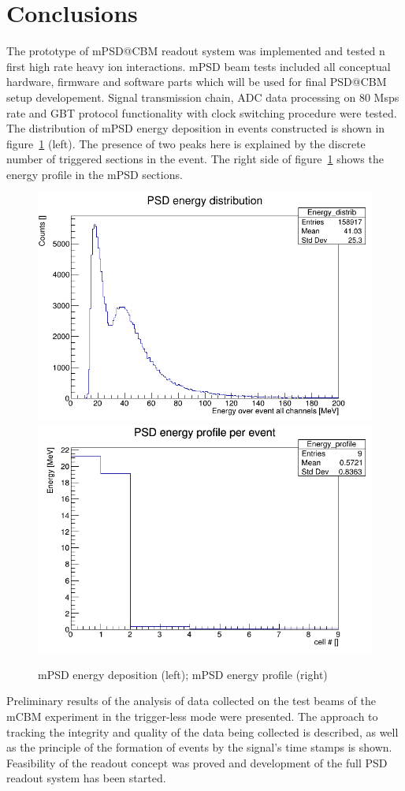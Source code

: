 \documentclass[a4paper,11pt]{article}
\begin{document}
\section{Conclusions}
The prototype of mPSD@CBM readout system was implemented and tested n first high rate heavy ion interactions. mPSD beam tests included all conceptual hardware, firmware and software parts which will be used for final PSD@CBM setup developement. Signal transmission chain, ADC data processing on 80 Msps rate and GBT protocol functionality with clock switching procedure were tested.
The distribution of mPSD energy deposition in events constructed is shown in figure~\ref{fig:7} (left). The presence of two peaks here is explained by the discrete number of triggered sections in the event. The right side of figure~\ref{fig:7} shows the energy profile in the mPSD sections.

\begin{figure}[htbp]
\centering %
\includegraphics[width=.45\textwidth]{PsdEdepInEvent_calibrd.png}
\qquad
\includegraphics[width=.45\textwidth]{PsdEprofileInEvent_calibrd.png}
\caption{\label{fig:7} mPSD energy deposition (left); mPSD energy profile (right)}
\end{figure}

Preliminary results of the analysis of data collected on the test beams of the mCBM experiment in the trigger-less mode were presented. The approach to tracking the integrity and quality of the data being collected is described, as well as the principle of the formation of events by the signal's time stamps is shown.
Feasibility of the readout concept was proved and development of the full PSD readout system has been started.
\end{document}
